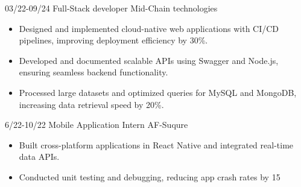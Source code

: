 \documentclass[9pt]{developercv}
\begin{document}
\vspace{-10 pt}
\begin{entrylist}
    \entry
    {03/22-09/24}
    {Full-Stack developer}
    {Mid-Chain technologies}
    {\vspace{-10pt}
        \begin{itemize}[noitemsep,topsep=0pt,parsep=0pt,partopsep=0pt, leftmargin=-1pt]
            \item {Designed and implemented cloud-native web applications with CI/CD pipelines, improving deployment efficiency by 30\%.}
            \item {Developed and documented scalable APIs using Swagger and Node.js, ensuring seamless backend functionality.}
            \item {Processed large datasets and optimized queries for MySQL and MongoDB, increasing data retrieval speed by 20\%.}


        \end{itemize}
    }
    \entry
    {6/22-10/22}
    {Mobile Application Intern}
    {AF-Suqure}
    {\vspace{-10pt}
        \begin{itemize}[noitemsep,topsep=0pt,parsep=0pt,partopsep=0pt, leftmargin=-1pt]
            \item {Built cross-platform applications in React Native and integrated real-time data APIs.}

            \item {Conducted unit testing and debugging, reducing app crash rates by 15%
            }


\end{itemize}}
\end{entrylist}
\end{document}
